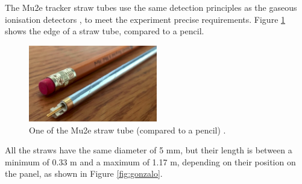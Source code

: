 The Mu2e tracker straw tubes use the same detection principles as the gaseous 
ionisation detectors \cite{kola}, to 
meet the experiment precise requirements.
Figure \ref{fig:trkpencil} shows the edge of a straw tube, compared to a pencil.
\begin{figure}[!h]
    \centering
    \includegraphics[width =0.5\textwidth]{figures/png/Screenshot_20240327_000000.png}
    \caption[A Mu2e straw tube.]{One of the Mu2e straw tube (compared to a pencil) \cite{trk}.}
    \label{fig:trkpencil}
    \end{figure}


All the straws have the same diameter of 5 mm, but their length 
is between a minimum of 0.33 m and a maximum of 1.17 m, 
depending on their position on the panel, as shown in Figure \ref{fig:gonzalo}.


